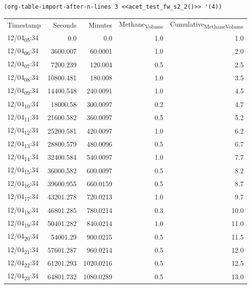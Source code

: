 \documentclass[11pt]{article}
\begin{document}
\begin{verbatim}
(org-table-import-after-n-lines 3 <<acet_test_fw_s2_2()>> '(4))
\end{verbatim}

\begin{center}
\begin{tabular}{lrrrr}
Timestamp & Seconds & Minutes & Methane\textsubscript{Volume} & Cumulative\textsubscript{Methane}\textsubscript{Volume}\\[0pt]
12/04\textsubscript{05}:34 & 0.0 & 0.0 & 1.0 & 1.0\\[0pt]
12/04\textsubscript{06}:34 & 3600.007 & 60.0001 & 1.0 & 2.0\\[0pt]
12/04\textsubscript{07}:34 & 7200.239 & 120.004 & 0.5 & 2.5\\[0pt]
12/04\textsubscript{08}:34 & 10800.481 & 180.008 & 1.0 & 3.5\\[0pt]
12/04\textsubscript{09}:34 & 14400.548 & 240.0091 & 1.0 & 4.5\\[0pt]
12/04\textsubscript{10}:34 & 18000.58 & 300.0097 & 0.2 & 4.7\\[0pt]
12/04\textsubscript{11}:34 & 21600.582 & 360.0097 & 0.5 & 5.2\\[0pt]
12/04\textsubscript{12}:34 & 25200.581 & 420.0097 & 1.0 & 6.2\\[0pt]
12/04\textsubscript{13}:34 & 28800.579 & 480.0096 & 0.5 & 6.7\\[0pt]
12/04\textsubscript{14}:34 & 32400.584 & 540.0097 & 1.0 & 7.7\\[0pt]
12/04\textsubscript{15}:34 & 36000.582 & 600.0097 & 0.5 & 8.2\\[0pt]
12/04\textsubscript{16}:34 & 39600.955 & 660.0159 & 0.5 & 8.7\\[0pt]
12/04\textsubscript{17}:34 & 43201.278 & 720.0213 & 1.0 & 9.7\\[0pt]
12/04\textsubscript{18}:34 & 46801.285 & 780.0214 & 0.3 & 10.0\\[0pt]
12/04\textsubscript{19}:34 & 50401.282 & 840.0214 & 1.0 & 11.0\\[0pt]
12/04\textsubscript{20}:34 & 54001.29 & 900.0215 & 0.5 & 11.5\\[0pt]
12/04\textsubscript{21}:34 & 57601.287 & 960.0214 & 0.5 & 12.0\\[0pt]
12/04\textsubscript{22}:34 & 61201.293 & 1020.0216 & 0.5 & 12.5\\[0pt]
12/04\textsubscript{23}:34 & 64801.732 & 1080.0289 & 0.5 & 13.0\\[0pt]

\end{tabular}
\end{center}
\end{document}
